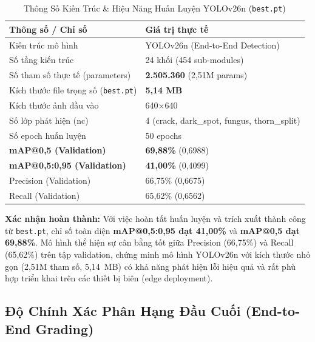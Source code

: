 \documentclass[12pt, a4paper]{article}
\begin{document}
\begin{table}[H]
  \centering
  \caption{Thông Số Kiến Trúc \& Hiệu Năng Huấn Luyện YOLOv26n (\texttt{best.pt})}
  \begin{tabularx}{\linewidth}{L{5.5cm} C{3.2cm}}
    \toprule
    \textbf{Thông số / Chỉ số} & \textbf{Giá trị thực tế} \\
    \midrule
    Kiến trúc mô hình & YOLOv26n (End-to-End Detection) \\
    Số tầng kiến trúc & 24 khối (454 sub-modules) \\
    Số tham số thực tế (parameters) & \textbf{2.505.360} (2,51M params) \\
    Kích thước file trọng số (\texttt{best.pt}) & \textbf{5,14 MB} \\
    Kích thước ảnh đầu vào & 640$\times$640 \\
    Số lớp phát hiện (nc) & 4 (crack, dark\_spot, fungus, thorn\_split) \\
    Số epoch huấn luyện & 50 epochs \\
    \textbf{mAP@0,5 (Validation)} & \textbf{69,88\%} (0,6988) \\
    \textbf{mAP@0,5:0,95 (Validation)} & \textbf{41,00\%} (0,4099) \\
    Precision (Validation) & 66,75\% (0,6675) \\
    Recall (Validation) & 65,62\% (0,6562) \\
    \bottomrule
  \end{tabularx}
\end{table}

\begin{tcolorbox}[notebox]
\textbf{Xác nhận hoàn thành:} Với việc hoàn tất huấn luyện và trích xuất thành công từ \texttt{best.pt}, chỉ số toàn diện \textbf{mAP@0,5:0,95 đạt 41,00\%} và \textbf{mAP@0,5 đạt 69,88\%}. Mô hình thể hiện sự cân bằng tốt giữa Precision (66,75\%) và Recall (65,62\%) trên tập validation, chứng minh mô hình YOLOv26n với kích thước nhỏ gọn (2,51M tham số, 5,14~MB) có khả năng phát hiện lỗi hiệu quả và rất phù hợp triển khai trên các thiết bị biên (edge deployment).
\end{tcolorbox}

\subsection{Độ Chính Xác Phân Hạng Đầu Cuối (End-to-End Grading)}
\end{document}
